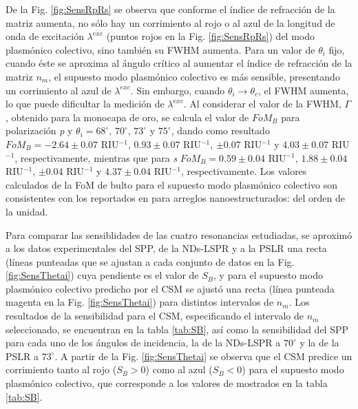 De la Fig. \ref{fig:SensRpRs} se observa que conforme el índice de refracción de la matriz aumenta, no sólo hay un corrimiento al rojo o al azul de la longitud de onda de excitación $\lambda^{exc}$  (puntos rojos en la Fig. \ref{fig:SensRpRs}) del modo plasmónico colectivo,  sino también  su FWHM  aumenta. Para un valor de $\theta_i$ fijo, cuando éste se aproxima al ángulo crítico al aumentar el índice de refracción de la matriz $n_m$, el supuesto modo  plasmónico colectivo es más sensible, presentando un corrimiento al azul de $\lambda^{exc}$. Sin embargo, cuando $\theta_i\to\theta_c$, el FWHM aumenta, lo que puede dificultar la medición de $\lambda^{exc}$. Al considerar el valor de la FWHM, $\Gamma$, obtenido para la monocapa de oro, se calcula el valor de $\textit{FoM}_B$ para polarización \emph{p} y $\theta_i=68^\circ,\, 70^\circ,\, 73^\circ$ y $75^\circ$, dando como resultado  $\textit{FoM}_B= -2.64\pm0.07$ RIU$^{-1}$, $0.93 \pm0.07$ RIU$^{-1}$, $ \pm0.07$ RIU$^{-1}$ y $4.03\pm0.07$ RIU$^{-1}$, respectivamente, mientras que para \emph{s} $\textit{FoM}_B= 0.59\pm0.04$ RIU$^{-1}$, $1.88 \pm0.04$ RIU$^{-1}$, $ \pm0.04 $ RIU$^{-1}$ y $4.37\pm0.04$ RIU$^{-1}$, respectivamente. Los valores calculados de la FoM de bulto para el supuesto modo plasmónico colectivo son consistentes con los reportados en \cite{svedendahl2009refractometric} para arreglos nanoestructurados: del orden de la unidad.

 Para comparar las sensiblidades de las cuatro resonancias estudiadas, se aproximó a los datos experimentales del SPP, de la NDs-LSPR y a la PSLR una recta (líneas punteadas que se ajustan a cada conjunto de datos en la Fig. \ref{fig:SensThetai}) cuya pendiente es el valor de $S_B$, y para el supuesto modo  plasmónico colectivo predicho por el CSM se ajustó una recta (línea punteada magenta en la Fig. \ref{fig:SensThetai}) para distintos intervalos de $n_m$. Los resultados de la sensibilidad para el CSM, especificando el  intervalo de $n_m$ seleccionado, se  encuentran en la tabla \ref{tab:SB}, así como la sensibilidad del SPP para cada uno de los ángulos de incidencia, la de la NDs-LSPR a $70^\circ$ y la de la PSLR a $73^\circ$. A partir de la Fig. \ref{fig:SensThetai} se observa que el  CSM predice un corrimiento tanto al  rojo ($S_B>0$) como al azul ($S_B<0$) para el supuesto modo plasmónico colectivo, que corresponde a los valores de mostrados en la tabla \ref{tab:SB}.

